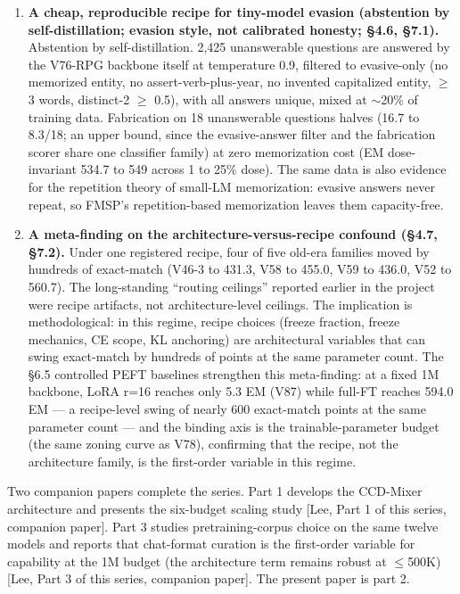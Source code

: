 \documentclass[11pt]{article}
\begin{document}
\begin{enumerate}
\item \textbf{A cheap, reproducible recipe for tiny-model evasion (abstention by self-distillation; evasion style, not calibrated honesty; \S4.6, \S7.1).} Abstention by self-distillation. 2{,}425 unanswerable questions are answered by the V76-RPG backbone itself at temperature 0.9, filtered to evasive-only (no memorized entity, no assert-verb-plus-year, no invented capitalized entity, $\geq$3 words, distinct-2 $\geq$ 0.5), with all answers unique, mixed at $\sim$20\% of training data. Fabrication on 18 unanswerable questions halves (16.7 to 8.3/18; an upper bound, since the evasive-answer filter and the fabrication scorer share one classifier family) at zero memorization cost (EM dose-invariant 534.7 to 549 across 1 to 25\% dose). The same data is also evidence for the repetition theory of small-LM memorization: evasive answers never repeat, so FMSP's repetition-based memorization leaves them capacity-free.

\item \textbf{A meta-finding on the architecture-versus-recipe confound (\S4.7, \S7.2).} Under one registered recipe, four of five old-era families moved by hundreds of exact-match (V46-3 to 431.3, V58 to 455.0, V59 to 436.0, V52 to 560.7). The long-standing ``routing ceilings'' reported earlier in the project were recipe artifacts, not architecture-level ceilings. The implication is methodological: in this regime, recipe choices (freeze fraction, freeze mechanics, CE scope, KL anchoring) are architectural variables that can swing exact-match by hundreds of points at the same parameter count. The \S6.5 controlled PEFT baselines strengthen this meta-finding: at a fixed 1M backbone, LoRA r=16 reaches only 5.3 EM (V87) while full-FT reaches 594.0 EM --- a recipe-level swing of nearly 600 exact-match points at the same parameter count --- and the binding axis is the trainable-parameter budget (the same zoning curve as V78), confirming that the recipe, not the architecture family, is the first-order variable in this regime.
\end{enumerate}

Two companion papers complete the series. Part 1 develops the CCD-Mixer architecture and presents the six-budget scaling study [Lee, Part 1 of this series, companion paper]. Part 3 studies pretraining-corpus choice on the same twelve models and reports that chat-format curation is the first-order variable for capability at the 1M budget (the architecture term remains robust at $\leq$500K) [Lee, Part 3 of this series, companion paper]. The present paper is part 2.
\end{document}
